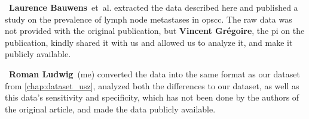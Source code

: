 \begin{tcolorbox}[title=\faIcon{users} Contributions, parbox=false]
    ~\textbf{Laurence Bauwens}~et~al.\cite{bauwens_prevalence_2021} extracted the data described here and published a study on the prevalence of lymph node metastases in \gls{opscc}. The raw data was not provided with the original publication, but  \textbf{Vincent Grégoire}, the \gls{pi} on the publication, kindly shared it with us and allowed us to analyze it, and make it publicly available.

    ~\textbf{Roman Ludwig}~(me) converted the data into the same format as our dataset from \cref{chap:dataset_usz}, analyzed both the differences to our dataset, as well as this data's sensitivity and specificity, which has not been done by the authors of the original article, and made the data publicly available.
\end{tcolorbox}
